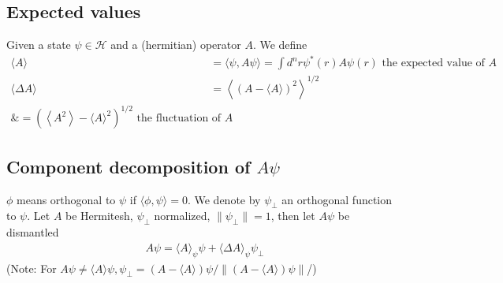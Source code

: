 \subsection{Expected values}
Given a state $\psi\in\mathcal{H}$ and a (hermitian) operator $A$. We define
\begin{equation}
\begin{aligned}
\langle A\rangle &=\langle\psi, A \psi\rangle=\int d^{n} r \psi^{*}(r) A \psi(r) \text { the expected value of } A \\\langle\Delta A\rangle &=\left\langle(A-\langle A\rangle)^{2}\right\rangle^{1 / 2} \\ \&=\left(\left\langle A^{2}\right\rangle-\langle A\rangle^{2}\right)^{1 / 2} \text { the fluctuation of } A \end{aligned}
\end{equation}
\subsection{Component decomposition of $A\psi$}
$\phi$ means orthogonal to $\psi$ if $\langle\phi,\psi\rangle=0$. We denote by $\psi_{\bot}$ an orthogonal function to $\psi$. Let $A$ be Hermitesh, $\psi_{\bot}$ normalized, $\parallel\psi_{\bot}\parallel=1$, then let $A\psi$ be dismantled
\begin{equation}
\begin{array}{c}{A \psi=\langle A\rangle_{\psi} \psi+\langle\Delta A\rangle_{\psi} \psi_{\perp}} \end{array}
\end{equation}
(Note: For $A\psi\neq\langle A\rangle\psi, \psi_{\bot}=(A-\langle A\rangle)\psi/\parallel(A-\langle A\rangle)\psi\parallel$/)
